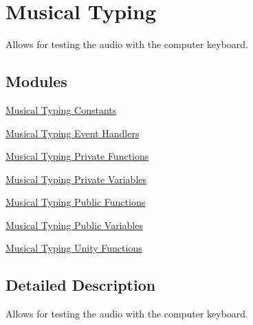 \hypertarget{group___mus_typ}{}\section{Musical Typing}
\label{group___mus_typ}


Allows for testing the audio with the computer keyboard.  


\subsection*{Modules}
\begin{DoxyCompactItemize}
\item 
\hyperlink{group___mus_typ_const}{Musical Typing Constants}
\item 
\hyperlink{group___mus_typ_handlers}{Musical Typing Event Handlers}
\item 
\hyperlink{group___mus_typ_priv_func}{Musical Typing Private Functions}
\item 
\hyperlink{group___mus_typ_priv_var}{Musical Typing Private Variables}
\item 
\hyperlink{group___mus_typ_pub_func}{Musical Typing Public Functions}
\item 
\hyperlink{group___mus_typ_pub_var}{Musical Typing Public Variables}
\item 
\hyperlink{group___mus_typ_unity}{Musical Typing Unity Functions}
\end{DoxyCompactItemize}


\subsection{Detailed Description}
Allows for testing the audio with the computer keyboard. 

